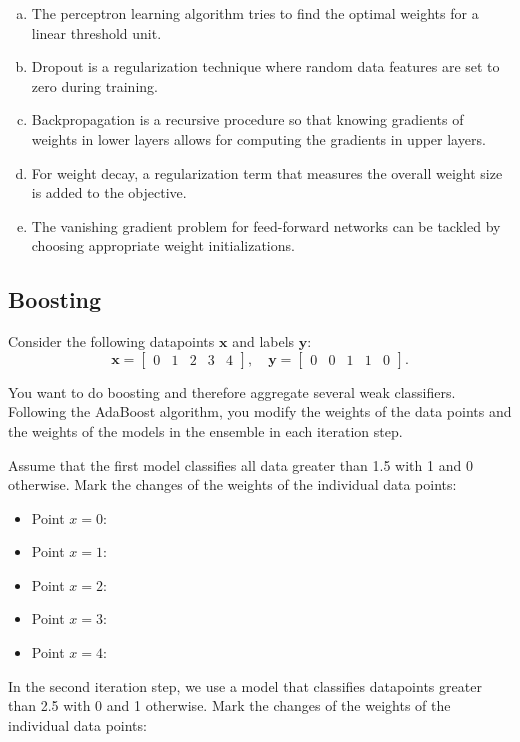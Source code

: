 \documentclass{article}
\begin{document}
\begin{enumerate}[(a)]
    \item The perceptron learning algorithm tries to find the optimal weights for a linear threshold unit.
    \item Dropout is a regularization technique where random data features are set to zero during training.
    \item Backpropagation is a recursive procedure so that knowing gradients of weights in lower layers allows for computing the gradients in upper layers.
    \item For weight decay, a regularization term that measures the overall weight size is added to the objective.
    \item The vanishing gradient problem for feed-forward networks can be tackled by choosing appropriate weight initializations.
\end{enumerate}

\subsection*{Boosting}
Consider the following datapoints \(\mathbf{x}\) and labels \(\mathbf{y}\):
\[
\mathbf{x} = \begin{bmatrix} 0 & 1 & 2 & 3 & 4 \end{bmatrix}, \quad
\mathbf{y} = \begin{bmatrix} 0 & 0 & 1 & 1 & 0 \end{bmatrix}.
\]

You want to do boosting and therefore aggregate several weak classifiers. Following the AdaBoost algorithm, you modify the weights of the data points and the weights of the models in the ensemble in each iteration step.

Assume that the first model classifies all data greater than 1.5 with 1 and 0 otherwise. Mark the changes of the weights of the individual data points:

\begin{itemize}
    \item Point \(x = 0\): 
    \item Point \(x = 1\): 
    \item Point \(x = 2\): 
    \item Point \(x = 3\): 
    \item Point \(x = 4\): 
\end{itemize}

In the second iteration step, we use a model that classifies datapoints greater than 2.5 with 0 and 1 otherwise. Mark the changes of the weights of the individual data points:
\end{document}
